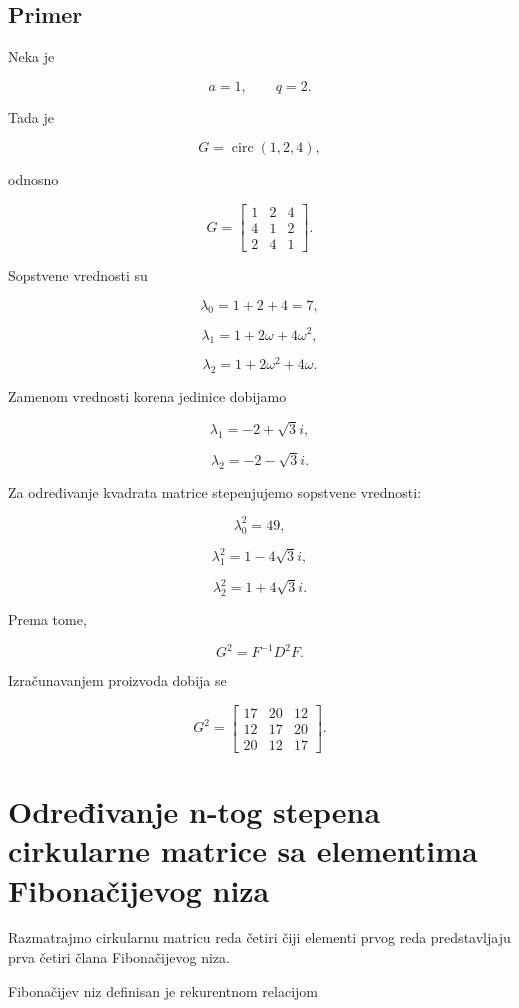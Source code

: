\documentclass[12pt,a4paper]{report}
\begin{document}
\section{Primer}

Neka je

\[
a=1,\qquad q=2.
\]

Tada je

\[
G=\operatorname{circ}(1,2,4),
\]

odnosno

\[
G=
\begin{bmatrix}
	1 & 2 & 4\\
	4 & 1 & 2\\
	2 & 4 & 1
\end{bmatrix}.
\]

Sopstvene vrednosti su

\[
\lambda_0=1+2+4=7,
\]

\[
\lambda_1=1+2\omega+4\omega^2,
\]

\[
\lambda_2=1+2\omega^2+4\omega.
\]

Zamenom vrednosti korena jedinice dobijamo

\[
\lambda_1=-2+\sqrt{3}i,
\]

\[
\lambda_2=-2-\sqrt{3}i.
\]

Za određivanje kvadrata matrice stepenjujemo sopstvene vrednosti:

\[
\lambda_0^2=49,
\]

\[
\lambda_1^2=1-4\sqrt{3}i,
\]

\[
\lambda_2^2=1+4\sqrt{3}i.
\]

Prema tome,

\[
G^2=F^{-1}D^2F.
\]

Izračunavanjem proizvoda dobija se

\[
\boxed{
	G^2=
	\begin{bmatrix}
		17 & 20 & 12\\
		12 & 17 & 20\\
		20 & 12 & 17
	\end{bmatrix}
}.
\]

\chapter{Određivanje n-tog stepena cirkularne matrice sa elementima Fibonačijevog niza}

Razmatrajmo cirkularnu matricu reda četiri čiji elementi prvog reda predstavljaju prva četiri člana Fibonačijevog niza.

Fibonačijev niz definisan je rekurentnom relacijom
\end{document}
